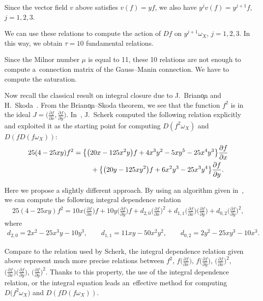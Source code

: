 \documentclass[10pt,a4paper]{amsart}
\numberwithin{equation}{section}
\begin{document}
\begin{Example}
Since the vector field $v$ above satisfies $v(f) = yf$, we also have $y^jv(f) = y^{j+1}f$, $j=1,2,3$.

We can use these relations to compute the action of $Df$ on $y^{j+1} \omega_X$, $j=1,2,3$.
In this way, we obtain $\tau=10$ fundamental relations.


Since the Milnor number $\mu$ is equal to 11, these 10 relations are not enough to compute a~connection matrix of the Gauss--Manin connection.
We have to compute the saturation.

Now recall the classical result on integral closure due to J.~Brian\c on and H.~Skoda~\cite{BSkoda}.
From the Brian\c on--Skoda theorem, we see that the function $f^2$ is in the ideal
$J=\big(\frac{\partial f}{\partial x}, \frac{\partial f}{\partial y}\big)$.
In~\cite{Sch}, J.~Scherk computed the following relation explicitly and exploited it as the starting point for computing $D(f^2\omega_X)$ and $D(fD(f\omega_X))$:
\begin{gather*}
25(4-25xy)f^2 = \big\{\big(20x-125x^2y\big)f+4x^3y^2-5xy^5-25x^4y^3\big\}\frac{\partial f}{\partial x}
\\ \hphantom{25(4-25xy)f^2 = \{}{}
+ \big\{\big(20y-125xy^2\big)f+6x^2y^3-25x^3y^4\big\}\frac{\partial f}{\partial y}.
\end{gather*}

Here we propose a slightly different approach.
By using an algorithm given in~\cite{NT20}, we can compute the following integral dependence relation
\begin{gather*}
25(4-25xy)f^2 = 10x\bigg(\frac{\partial f}{\partial x}\bigg)f\!+\!10y\bigg(\frac{\partial f}{\partial y}\bigg)f\!+\!d_{2,0}\bigg(\frac{\partial f}{\partial x}\bigg)^2\!+\!d_{1,1}\bigg(\frac{\partial f}{\partial x}\bigg)\bigg(\frac{\partial f}{\partial y}\bigg)\!+\!d_{0,2}\bigg(\frac{\partial f}{\partial y}\bigg)^2,
\end{gather*}
where
\begin{gather*}
d_{2,0}=2x^2-25x^3y-10y^3, \qquad
d_{1,1}=11xy-50x^2y^2, \qquad
d_{0,2}=2y^2-25xy^3-10x^3.
\end{gather*}

Compare to the relation used by Scherk, the integral dependence relation given above represent much more precise relations between $f^2$, $f\big(\frac{\partial f}{\partial x}\big)$,
$f\big(\frac{\partial f}{\partial y}\big)$, $\big(\frac{\partial f}{\partial x}\big)^2$,
$\big(\frac{\partial f}{\partial x}\big)\big(\frac{\partial f}{\partial y}\big)$,
$\big(\frac{\partial f}{\partial y}\big)^2$. Thanks to this property,
the use of the integral dependence relation, or the integral equation leads an~effective method for computing $ D\big(f^2\omega_X\big) $ and $ D(fD(f\omega_X))$.
\end{Example}
\end{document}
